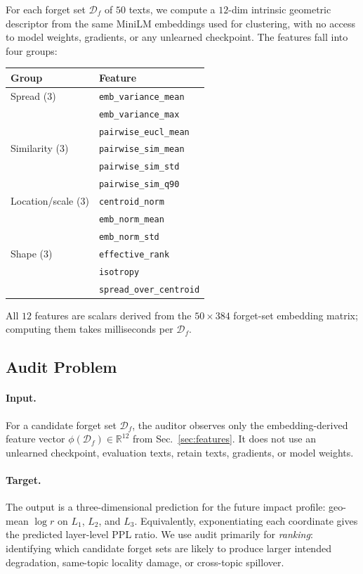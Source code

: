 \documentclass[11pt,a4paper]{article}
\newcommand{\Df}{\mathcal{D}_f}
\newcommand{\Lone}{L_1}
\newcommand{\Ltwo}{L_2}
\newcommand{\Lthree}{L_3}
\begin{document}
For each forget set $\Df$ of $50$ texts, we compute a $12$-dim intrinsic
geometric descriptor from the same MiniLM embeddings used for clustering, with
no access to model weights, gradients, or any unlearned checkpoint. The features
fall into four groups:
\begin{center}
\footnotesize
\begin{tabular}{@{}ll@{}}
    \toprule
    Group & Feature \\
    \midrule
    Spread (3)
        & \texttt{emb\_variance\_mean} \\
        & \texttt{emb\_variance\_max} \\
        & \texttt{pairwise\_eucl\_mean} \\
    Similarity (3)
        & \texttt{pairwise\_sim\_mean} \\
        & \texttt{pairwise\_sim\_std} \\
        & \texttt{pairwise\_sim\_q90} \\
    Location/scale (3)
        & \texttt{centroid\_norm} \\
        & \texttt{emb\_norm\_mean} \\
        & \texttt{emb\_norm\_std} \\
    Shape (3)
        & \texttt{effective\_rank} \\
        & \texttt{isotropy} \\
        & \texttt{spread\_over\_centroid} \\
    \bottomrule
\end{tabular}
\end{center}
All $12$ features are scalars derived from the $50\times 384$ forget-set embedding matrix; computing them takes milliseconds per $\Df$.

\subsection{Audit Problem}
\label{sec:audit-problem}

\paragraph{Input.} For a candidate forget set $\Df$, the auditor observes only
the embedding-derived feature vector $\phi(\Df)\in\mathbb{R}^{12}$ from
Sec.~\ref{sec:features}. It does not use an unlearned checkpoint, evaluation
texts, retain texts, gradients, or model weights.

\paragraph{Target.} The output is a three-dimensional prediction for the
future impact profile: geo-mean $\log r$ on $\Lone$, $\Ltwo$, and $\Lthree$.
Equivalently, exponentiating each coordinate gives the predicted layer-level
PPL ratio. We use audit primarily for \emph{ranking}: identifying which
candidate forget sets are likely to produce larger intended degradation,
same-topic locality damage, or cross-topic spillover.
\end{document}
